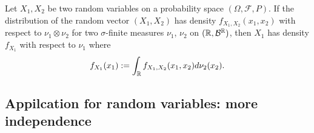 \begin{corollary}
\label{cor: integrate out the joint}
Let $X_1, X_2$ be two random variables on a probability space $(\Omega, \mathcal F, P)$. If the distribution of the random vector $(X_1,X_2)$ has density $f_{X_1, X_2}(x_1,x_2)$ with respect to $\nu_1\otimes \nu_2$ for two $\sigma$-finite measures $\nu_1$, $\nu_2$ on $(\Bbb R, \mathcal B^{\Bbb R})$, then $X_1$ has density $f_{X_1}$ with respect to $\nu_1$ where
\[ f_{X_1}(x_1):= \int_{\Bbb R}  f_{X_1, X_2}(x_1,x_2) d\nu_2(x_2) . \]
\end{corollary}




\subsection{Appilcation for random variables: more independence}



